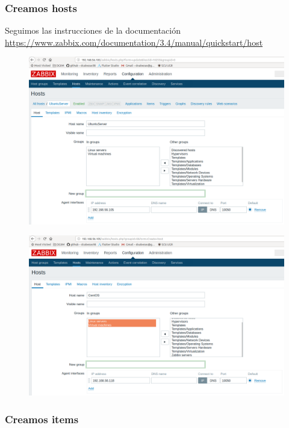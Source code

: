 \documentclass{article}
\begin{document}
\subsubsection*{Creamos hosts}

Seguimos las instrucciones de la documentación \url{https://www.zabbix.com/documentation/3.4/manual/quickstart/host}

\begin{figure}[H]
  \centering
  \includegraphics[width=140mm]{screenshots/new-host_us}
\end{figure}

\begin{figure}[H]
  \centering
  \includegraphics[width=140mm]{screenshots/new-host_centos}
\end{figure}

\newpage

\subsubsection*{Creamos items}
\end{document}
